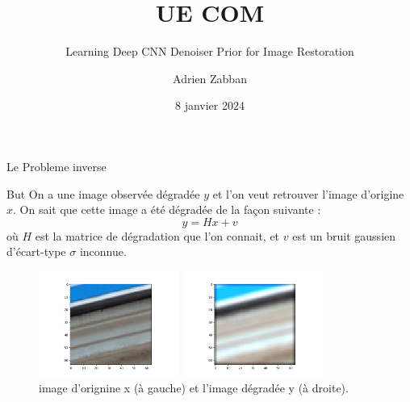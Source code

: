 \documentclass[11pt]{beamer}
\title{UE COM}
\subtitle{Learning Deep CNN Denoiser Prior for Image Restoration}
\author{Adrien Zabban}
\date{8 janvier 2024}
\begin{document}
\maketitle

\begin{frame}{Le Probleme inverse}
    \begin{block}{But}
        On a une image observée dégradée $y$ et l'on veut retrouver l'image d'origine $x$. On sait 
        que cette image a été dégradée de la façon suivante : 
        $$y = Hx + v$$
        où $H$ est la matrice de 
        dégradation que l'on connait, et $v$ est un bruit gaussien d'écart-type $\sigma$ inconnue.
    \end{block}
    \begin{figure}[b]
        \centering
        \includegraphics[width=0.41\textwidth]{../debluring/x.png}
        \hspace{1cm}
        \includegraphics[width=0.41\textwidth]{../debluring/y.png}
        \caption{image d'orignine x (à gauche) et l'image dégradée y (à droite).}
    \end{figure}
\end{frame}
\end{document}
